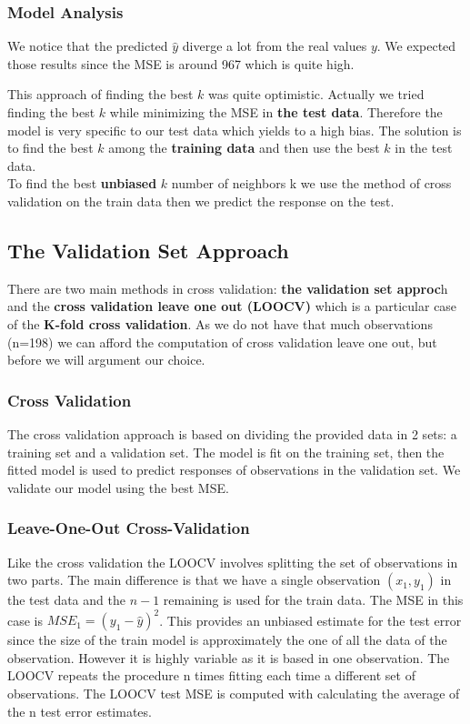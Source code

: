 \documentclass[]{report}
\begin{document}
\subsubsection{Model Analysis}

We notice that the predicted {$\hat{y}$} diverge a lot from the real values $y$. We expected those results since the MSE is around 967 which is quite high. 

This approach of finding the best $k$ was quite optimistic. Actually we tried finding the best $k$ while minimizing the MSE in \textbf{the test data}. Therefore the model is very specific to our test data which yields to a high bias. The solution is to find the best $k$ among the \textbf{training data} and then use the best $k$ in the test data. \\ To find the best \textbf{unbiased} $k$ number of neighbors k we use the method of cross validation on the train data then we predict the response on the test. 

\subsection{The Validation Set Approach}
There are two main methods in cross validation: \textbf{the validation set approc}h and the \textbf{cross validation leave one out (LOOCV)} which is a particular case of the  \textbf{K-fold cross validation}. As we do not have that much observations (n=198) we can afford the computation of cross validation leave one out, but before we will argument our choice.\\

\subsubsection{Cross Validation}
The cross validation approach is based on dividing the provided data in 2 sets: a training set and a validation set. The model is fit on the training set, then the fitted model is used to predict responses of observations in the validation set. We validate our model using the best MSE.

\subsubsection{Leave-One-Out Cross-Validation}
Like the cross validation the LOOCV involves splitting the set of observations in two parts. The main difference is that we have a single observation $(x_1, y_1)$ in the test data and the $n-1$ remaining is used for the train data. The MSE in this case is $MSE_1 =(y_1 - \hat{y})^{2}$. This provides an unbiased estimate for the test error since the size of the train model is approximately the one of all the data of the observation. However it is highly variable as it is based in one observation. The LOOCV repeats the procedure n times fitting each time a different set of observations. The LOOCV test MSE is computed with calculating the average of the n test error estimates.
  
\end{document}
